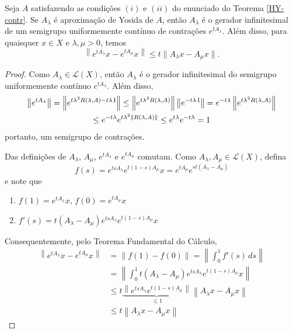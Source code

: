 \begin{lemma}\label{Plem3.4}
Seja $A$ satisfazendo as condições $(i)$ e $(ii)$ do enunciado do Teorema \ref{HY-contr}. Se $A_\lambda$ é  aproximação de Yosida de $A$, então $A_\lambda$ é o gerador infinitesimal de um semigrupo uniformemente contínuo de contrações $e^{tA_\lambda}$. Além disso, para quaisquer $x\in X$ e $\lambda,\mu>0$, temos
\begin{equation*}
\left\|e^{tA_\lambda}x-e^{tA_\mu}x\right\|\leq t\|A_\lambda x-A_\mu x\|.
\end{equation*}
\end{lemma}
\begin{proof}
Como $A_\lambda \in \mathcal{L}(X)$, então $A_\lambda$ é o gerador infinitesimal do semigrupo uniformemente contínuo $e^{tA_\lambda}$. Além disso,
\begin{multline*}
\left\|e^{tA_\lambda}\right\|
 =\left\|e^{t\lambda^2R(\lambda,A)-t\lambda \operatorname{I}}\right\|
\leq \left\|e^{t\lambda^2R(\lambda,A)}\right\|\left\|e^{-t\lambda \operatorname{I}} \right\|
=e^{-t\lambda }\left\|e^{t\lambda^2R(\lambda,A)}\right\|\\ 
\leq e^{-t\lambda }e^{t\lambda^2\left\|R(\lambda,A)\right\|}
 \leq e^{t\lambda }e^{-t\lambda }=1
\end{multline*}
portanto, um semigrupo de contrações.

Das definições de $A_\lambda$, $A_\mu$, $e^{tA_\lambda}$ e $e^{tA_\mu}$ 
comutam. Como $A_\lambda,  A_\mu\in\mathcal{L}(X)$, defina 
\[f(s)=e^{tsA_\lambda}e^{t(1-s)A_\mu}x=e^{tA_\mu}e^{st(A_\lambda-A_\mu)} \]
e note que
\begin{enumerate}
\item $f(1)=e^{tA_\lambda}x$, $f(0)=e^{tA_\mu}x$
\item $f'(s)=t(A_\lambda-A_\mu)e^{tsA_\lambda}e^{t(1-s)A_\mu}x$
\end{enumerate}
Consequentemente, pelo Teorema Fundamental do Cálculo,
\begin{align*}
\left\|e^{tA_\lambda}x-e^{tA_\mu}x \right\|
& =\left\|f(1)-f(0) \right\|=
\left\|\int_0^1 f'(s)\,ds \right\|\\
& =\left\|\int_0^1 
t(A_\lambda-A_\mu)e^{tsA_\lambda}e^{t(1-s)A_\mu}x\right\|\\
& \leq t\underbrace{\left\|e^{tsA_\lambda}e^{t(1-s)A_\mu}\right\|}_{\leq 1}   \left\|A_\lambda x-A_\mu x\right\|\\
& \leq t \left\|A_\lambda x-A_\mu x\right\|
\end{align*}
\end{proof}


